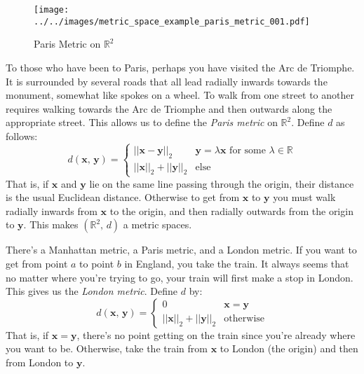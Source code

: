 \documentclass{article}
\theoremstyle{plain}
\theoremstyle{normal}
\newenvironment{example}{%
    \pushQED{\qed}\renewcommand{\qedsymbol}{$\blacksquare$}\examplex%
}{%
    \popQED\endexamplex%
}
\begin{document}
        \begin{figure}
            \centering
            \texttt{[image: ../../images/metric\_space\_example\_paris\_metric\_001.pdf]}
            \caption{Paris Metric on $\mathbb{R}^{2}$}
            \label{fig:metric_space_example_paris_metric_001}
        \end{figure}
        \begin{example}
            To those who have been to Paris, perhaps you have visited the
            Arc de Triomphe. It is surrounded by several roads that all lead
            radially inwards towards the monument, somewhat like spokes on
            a wheel. To walk from one street to another requires walking towards
            the Arc de Triomphe and then outwards along the appropriate street.
            This allows us to define the \textit{Paris metric} on
            $\mathbb{R}^{2}$. Define $d$ as follows:
            \begin{equation}
                d(\mathbf{x},\,\mathbf{y})=
                \begin{cases}
                    ||\mathbf{x}-\mathbf{y}||_{2}&
                        \mathbf{y}=\lambda\mathbf{x}\textrm{ for some }
                        \lambda\in\mathbb{R}\\
                    ||\mathbf{x}||_{2}+||\mathbf{y}||_{2}&
                        \textrm{else}
                \end{cases}
            \end{equation}
            That is, if $\mathbf{x}$ and $\mathbf{y}$ lie on the same line
            passing through the origin, their distance is the usual Euclidean
            distance. Otherwise to get from $\mathbf{x}$ to $\mathbf{y}$ you
            must walk radially inwards from $\mathbf{x}$ to the origin, and
            then radially outwards from the origin to $\mathbf{y}$. This makes
            $(\mathbb{R}^{2},\,d)$ a metric spaces.
        \end{example}
        \begin{example}
            There's a Manhattan metric, a Paris metric, and a London metric.
            If you want to get from point $a$ to point $b$ in England, you take
            the train. It always seems that no matter where you're trying to
            go, your train will first make a stop in London. This gives us the
            \textit{London metric}. Define $d$ by:
            \begin{equation}
                d(\mathbf{x},\,\mathbf{y})=
                \begin{cases}
                    0&\mathbf{x}=\mathbf{y}\\
                    ||\mathbf{x}||_{2}+||\mathbf{y}||_{2}&\textrm{otherwise}
                \end{cases}
            \end{equation}
            That is, if $\mathbf{x}=\mathbf{y}$, there's no point getting on
            the train since you're already where you want to be. Otherwise,
            take the train from $\mathbf{x}$ to London (the origin) and then
            from London to $\mathbf{y}$.
        \end{example}
\end{document}
